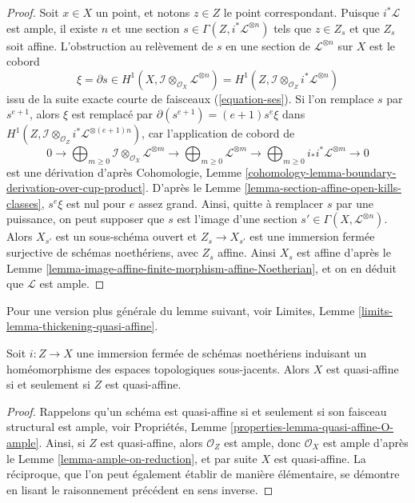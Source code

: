 \begin{proof}
\medskip\noindent
Soit $x \in X$ un point, et notons $z \in Z$ le point correspondant.
Puisque $i^*\mathcal{L}$ est ample, il existe $n$ et une section
$s \in \Gamma(Z, i^*\mathcal{L}^{\otimes n})$ tels que $z \in Z_s$
et que $Z_s$ soit affine. L'obstruction au relèvement de $s$ en une section
de $\mathcal{L}^{\otimes n}$ sur $X$ est le cobord
$$
\xi = \partial s \in
H^1(X, \mathcal{I} \otimes_{\mathcal{O}_X} \mathcal{L}^{\otimes n}) =
H^1(Z, \mathcal{I} \otimes_{\mathcal{O}_Z} i^*\mathcal{L}^{\otimes n})
$$
issu de la suite exacte courte de faisceaux (\ref{equation-ses}).
Si l'on remplace $s$ par $s^{e + 1}$, alors $\xi$ est remplacé par
$\partial(s^{e + 1}) = (e + 1) s^e \xi$ dans
$H^1(Z, \mathcal{I} \otimes_{\mathcal{O}_Z} i^*\mathcal{L}^{\otimes (e + 1)n})$,
car l'application de cobord de
$$
0 \to
\bigoplus\nolimits_{m \geq 0}
\mathcal{I} \otimes_{\mathcal{O}_X} \mathcal{L}^{\otimes m} \to
\bigoplus\nolimits_{m \geq 0}
\mathcal{L}^{\otimes m} \to
\bigoplus\nolimits_{m \geq 0}
i_*i^*\mathcal{L}^{\otimes m} \to 0
$$
est une dérivation d'après Cohomologie, Lemme
\ref{cohomology-lemma-boundary-derivation-over-cup-product}. D'après le
Lemme \ref{lemma-section-affine-open-kills-classes},
$s^e \xi$ est nul pour $e$ assez grand.
Ainsi, quitte à remplacer $s$ par une puissance, on peut supposer que $s$ est l'image
d'une section $s' \in \Gamma(X, \mathcal{L}^{\otimes n})$.
Alors $X_{s'}$ est un sous-schéma ouvert et $Z_s \to X_{s'}$ est une immersion
fermée surjective de schémas noethériens, avec $Z_s$ affine. Ainsi
$X_s$ est affine d'après le
Lemme \ref{lemma-image-affine-finite-morphism-affine-Noetherian},
et on en déduit que $\mathcal{L}$ est ample.
\end{proof}

\noindent
Pour une version plus générale du lemme suivant, voir
Limites, Lemme \ref{limits-lemma-thickening-quasi-affine}.

\begin{lemma}
\label{lemma-thickening-quasi-affine}
Soit $i : Z \to X$ une immersion fermée de schémas noethériens
induisant un homéomorphisme des espaces topologiques sous-jacents.
Alors $X$ est quasi-affine si et seulement si $Z$ est quasi-affine.
\end{lemma}

\begin{proof}
Rappelons qu'un schéma est quasi-affine
si et seulement si son faisceau structural est ample, voir
Propriétés, Lemme \ref{properties-lemma-quasi-affine-O-ample}.
Ainsi, si $Z$ est quasi-affine, alors $\mathcal{O}_Z$ est ample,
donc $\mathcal{O}_X$ est ample d'après le
Lemme \ref{lemma-ample-on-reduction}, et par suite
$X$ est quasi-affine. La réciproque, que l'on peut
également établir de manière élémentaire, se démontre
en lisant le raisonnement précédent en sens inverse.
\end{proof}

